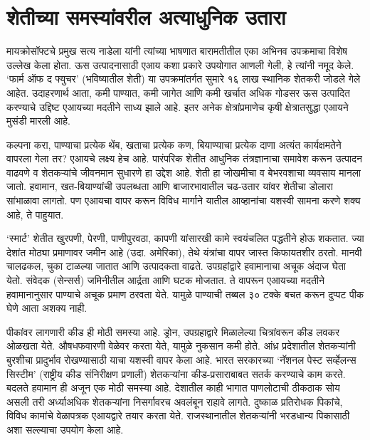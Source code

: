 \chapter{शेतीच्या समस्यांवरील अत्याधुनिक उतारा}

मायक्रोसॉफ्टचे प्रमुख सत्य नाडेला यांनी त्यांच्या भाषणात बारामतीतील एका अभिनव उपक्रमाचा विशेष उल्लेख केला होता. ऊस उत्पादनासाठी एआय कशा प्रकारे उपयोगात आणली गेली, हे त्यांनी नमूद केले. `फार्म ऑफ द फ्युचर' (भविष्यातील शेती) या उपक्रमांतर्गत सुमारे १६ लाख स्थानिक शेतकरी जोडले गेले आहेत. उदाहरणार्थ आता, कमी पाण्यात, कमी जागेत आणि कमी खर्चात अधिक गोडसर ऊस उत्पादित करण्याचे उद्दिष्ट एआयच्या मदतीने साध्य झाले आहे. इतर अनेक क्षेत्रांप्रमाणेच कृषी क्षेत्रातसुद्धा एआयने मुसंडी मारली आहे.

कल्पना करा, पाण्याचा प्रत्येक थेंब, खताचा प्रत्येक कण, बियाण्याचा प्रत्येक दाणा अत्यंत कार्यक्षमतेने वापरला गेला तर? एआयचे लक्ष्य हेच आहे. पारंपरिक शेतीत आधुनिक तंत्रज्ञानाचा समावेश करून उत्पादन वाढवणे व शेतकऱ्यांचे जीवनमान सुधारणे हा उद्देश आहे. शेती हा जोखमीचा व बेभरवशाचा व्यवसाय मानला जातो. हवामान, खत-बियाण्यांची उपलब्धता आणि बाजारभावातील चढ-उतार यांवर शेतीचा डोलारा सांभाळावा लागतो. पण एआयचा वापर करून विविध मार्गाने यातील  आव्हानांचा यशस्वी सामना करणे शक्य आहे, ते पाहुयात.

`स्मार्ट' शेतीत खुरपणी, पेरणी, पाणीपुरवठा, कापणी यांसारखी कामे स्वयंचलित पद्धतीने होऊ शकतात. ज्या देशांत मोठ्या प्रमाणावर जमीन आहे (उदा. अमेरिका), तेथे यंत्रांचा वापर जास्त किफायतशीर ठरतो. मानवी चालढकल, चुका टाळल्या जातात आणि उत्पादकता वाढते. उपग्रहांद्वारे हवामानाचा अचूक अंदाज घेता येतो. संवेदक (सेन्सर्स) जमिनीतील आर्द्रता आणि घटक मोजतात. ते वापरून एआयच्या मदतीने हवामानानुसार पाण्याचे अचूक प्रमाण ठरवता येते. यामुळे पाण्याची तब्बल ३० टक्के बचत करून दुप्पट पीक घेणे आता अशक्य नाही.

पीकांवर लागणारी कीड ही मोठी समस्या आहे. ड्रोन, उपग्रहाद्वारे मिळालेल्या चित्रांवरून कीड लवकर ओळखता येते. औषधफवारणी वेळेवर करता येते, यामुळे नुकसान कमी होते. आंध्र प्रदेशातील शेतकऱ्यांनी बुरशीचा प्रादुर्भाव रोखण्यासाठी याचा यशस्वी वापर केला आहे. भारत सरकारच्या `नॅशनल पेस्ट सर्व्हेलन्स सिस्टीम' (राष्ट्रीय कीड संनिरीक्षण प्रणाली) शेतकऱ्यांना कीड-प्रसाराबाबत सतर्क करण्याचे काम करते. बदलते हवामान ही अजून एक मोठी समस्या आहे. देशातील काही भागात पाणलोटाची ठीकठाक सोय असली तरी अर्ध्याअधिक शेतकऱ्यांना निसर्गावरच अवलंबून राहावे लागते. दुष्काळ प्रतिरोधक पिकांचे, विविध कामांचे वेळापत्रक एआयद्वारे तयार करता येते. राजस्थानातील शेतकऱ्यांनी भरडधान्य पिकासाठी अशा सल्ल्याचा उपयोग केला आहे.

